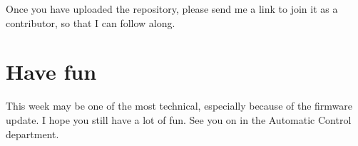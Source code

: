 Once you have uploaded the repository, please send me a link to join it as a contributor, so that I can follow along.




\section*{Have fun}

This week may be one of the most technical, especially because of the firmware update.
I hope you still have a lot of fun.
See you on  in the Automatic Control department.
